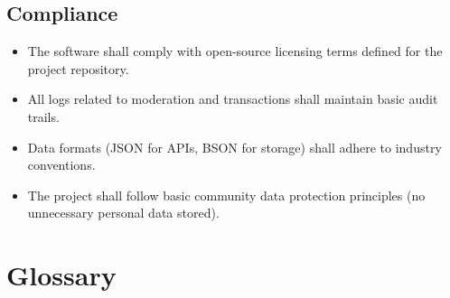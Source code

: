 \documentclass[11pt,a4paper]{report}
\begin{document}
\subsection{Compliance}

\begin{itemize}
    \item The software shall comply with open-source licensing terms defined for the project repository.
    \item All logs related to moderation and transactions shall maintain basic audit trails.
    \item Data formats (JSON for APIs, BSON for storage) shall adhere to industry conventions.
    \item The project shall follow basic community data protection principles (no unnecessary personal data stored).
\end{itemize}

\section{Glossary}
\label{sec:glossary}
\end{document}
